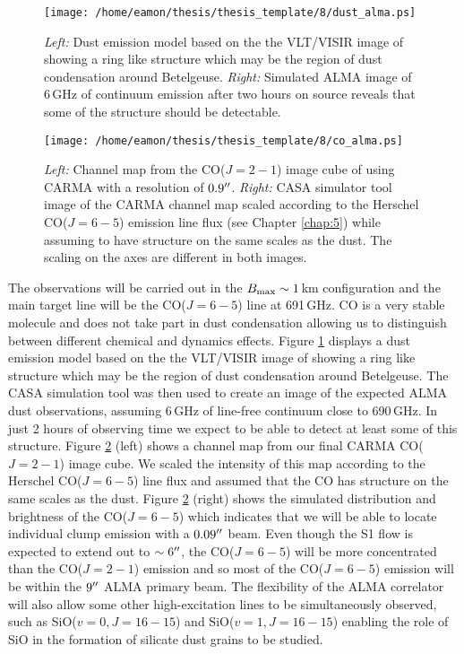 \begin{figure}[!ht]
\centering 
        \texttt{[image: /home/eamon/thesis/thesis\_template/8/dust\_alma.ps]}
\caption[Simulating ALMA dust observations]{\textit{Left:} Dust emission model based on the the VLT/VISIR image of \cite{kervella_2011} showing a ring like structure which may be the region of dust condensation around Betelgeuse. \textit{Right:} Simulated ALMA image of 6\,GHz of continuum emission after two hours on source reveals that some of the structure should be detectable. }
\label{fig:8.1}
\end{figure}

\begin{figure}[!ht]
\centering 
        \texttt{[image: /home/eamon/thesis/thesis\_template/8/co\_alma.ps]}
\caption[Simulating ALMA CO($J=6-5$) observations]{\textit{Left:} Channel map from the CO($J=2-1$) image cube of \cite{ogorman_2012} using CARMA with a resolution of $0.9^{\prime\prime}$. \textit{Right:} CASA simulator tool image of the CARMA channel map scaled according to the Herschel CO($J=6-5$) emission line flux (see Chapter \ref{chap:5}) while assuming to have structure on the same scales as the dust. The scaling on the axes are different in both images.} 
\label{fig:8.2}
\end{figure}

The observations will be carried out in the $B_{\rm{max}} \sim 1\,$km configuration and the main target line will be the CO($J=6-5$) line at 691\,GHz. CO is a very stable molecule and does not take part in dust condensation allowing us to distinguish between different chemical and dynamics effects. Figure \ref{fig:8.1} displays a dust emission model based on the the VLT/VISIR image of \cite{kervella_2011} showing a ring like structure which may be the region of dust condensation around Betelgeuse. The CASA simulation tool was then used to create an image of the expected ALMA dust observations, assuming 6\,GHz of line-free continuum close to 690\,GHz. In just 2 hours of observing time we expect to be able to detect at least some of this structure. Figure \ref{fig:8.2} (left) shows a channel map from our final CARMA CO($J=2-1$) image cube. We scaled the intensity of this map according to the Herschel CO($J=6-5$) line flux and assumed that the CO has structure on the same scales as the dust. Figure \ref{fig:8.2} (right) shows the simulated distribution and brightness of the CO($J=6-5$) which indicates that we will be able to locate individual clump emission with a $0.09^{\prime\prime}$ beam. Even though the S1 flow is expected to extend out to $\sim 6^{\prime\prime}$, the CO($J=6-5$) will be more concentrated than the CO($J=2-1$) emission and so most of the  CO($J=6-5$) emission will be within the $9^{\prime\prime}$ ALMA primary beam. The flexibility of the ALMA correlator will also allow some other high-excitation lines to be simultaneously observed, such as SiO($v=0, J=16-15$) and SiO($v=1,J=16-15$) enabling the role of SiO in the formation of silicate dust grains to be studied. 

